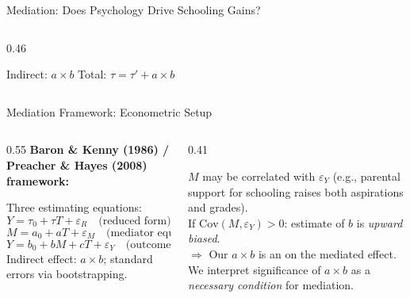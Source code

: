 \documentclass[aspectratio=169, 10pt]{beamer}
\begin{document}
\begin{frame}{Mediation: Does Psychology Drive Schooling Gains?}
\begin{columns}
\begin{column}{0.46\textwidth}
\begin{center}
{}
      \end{center}
      \vspace{0.3em}
      {\small Indirect: $a \times b$ \quad Total: $\tau = \tau' + a \times b$}
    \end{column}
  \end{columns}
\end{frame}

\begin{frame}{Mediation Framework: Econometric Setup}
  \begin{columns}
    \begin{column}{0.55\textwidth}
      \textbf{Baron \& Kenny (1986) / Preacher \& Hayes (2008) framework:}

      \vspace{0.4em}
      Three estimating equations:
      \[
        Y = \tau_0 + \tau T + \varepsilon_R \quad \text{(reduced form)}
      \]
      \[
        M = a_0 + aT + \varepsilon_M \quad \text{(mediator equation)}
      \]
      \[
        Y = b_0 + bM + cT + \varepsilon_Y \quad \text{(outcome equation)}
      \]
      Indirect effect: $a \times b$; standard errors via bootstrapping.
    \end{column}
    \begin{column}{0.41\textwidth}
      \begin{assumptionbox}
        $M$ may be correlated with $\varepsilon_Y$ (e.g., parental support for schooling raises both aspirations and grades).\\[0.4em]
        If $\mathrm{Cov}(M, \varepsilon_Y) > 0$: estimate of $b$ is \emph{upward biased}.\\[0.4em]
        $\Rightarrow$ Our $a \times b$ is an  on the mediated effect.\\[0.3em]
        We interpret significance of $a \times b$ as a \emph{necessary condition} for mediation.
      \end{assumptionbox}
    \end{column}
  \end{columns}
\end{frame}
\end{document}
